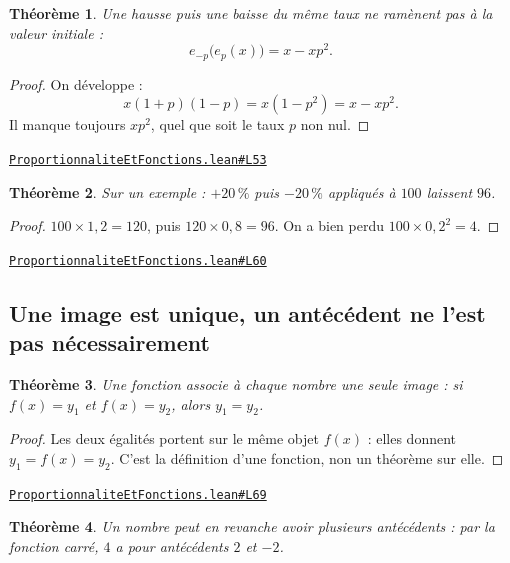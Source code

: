 \documentclass[11pt,a4paper]{article}
\theoremstyle{definition}
\theoremstyle{plain}
\newtheorem{theoreme}{Théorème}
\newcommand{\source}[2]{\par\smallskip\noindent\hfill{\footnotesize\href{#1}{\texttt{#2}}}\par\smallskip}
\begin{document}
\begin{theoreme}
Une hausse puis une baisse du même taux ne ramènent pas à la valeur initiale :
\[ e_{-p}\bigl(e_p(x)\bigr) = x - xp^2 . \]
\end{theoreme}

\begin{proof}
On développe :
\[ x(1+p)(1-p) = x(1 - p^2) = x - xp^2 . \]
Il manque toujours $xp^2$, quel que soit le taux $p$ non nul.
\end{proof}
\source{https://github.com/Commutator-IO/learn-lean/blob/main/cours/01-college/05-proportionnalite-et-fonctions/ProportionnaliteEtFonctions.lean\#L53}{ProportionnaliteEtFonctions.lean\#L53}

\begin{theoreme}
Sur un exemple : $+20\,\%$ puis $-20\,\%$ appliqués à $100$ laissent $96$.
\end{theoreme}

\begin{proof}
$100 \times 1{,}2 = 120$, puis $120 \times 0{,}8 = 96$. On a bien perdu
$100 \times 0{,}2^2 = 4$.
\end{proof}
\source{https://github.com/Commutator-IO/learn-lean/blob/main/cours/01-college/05-proportionnalite-et-fonctions/ProportionnaliteEtFonctions.lean\#L60}{ProportionnaliteEtFonctions.lean\#L60}

\subsection{Une image est unique, un antécédent ne l'est pas nécessairement}

\begin{theoreme}
Une fonction associe à chaque nombre une seule image : si $f(x) = y_1$ et $f(x) = y_2$,
alors $y_1 = y_2$.
\end{theoreme}

\begin{proof}
Les deux égalités portent sur le même objet $f(x)$ : elles donnent $y_1 = f(x) = y_2$.
C'est la définition d'une fonction, non un théorème sur elle.
\end{proof}
\source{https://github.com/Commutator-IO/learn-lean/blob/main/cours/01-college/05-proportionnalite-et-fonctions/ProportionnaliteEtFonctions.lean\#L69}{ProportionnaliteEtFonctions.lean\#L69}

\begin{theoreme}
Un nombre peut en revanche avoir plusieurs antécédents : par la fonction carré, $4$ a
pour antécédents $2$ et $-2$.
\end{theoreme}
\end{document}
